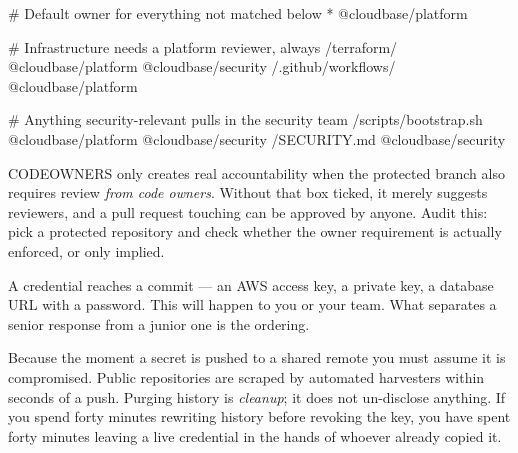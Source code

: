\begin{propsbox}
# Default owner for everything not matched below
*                       @cloudbase/platform

# Infrastructure needs a platform reviewer, always
/terraform/             @cloudbase/platform @cloudbase/security
/.github/workflows/     @cloudbase/platform

# Anything security-relevant pulls in the security team
/scripts/bootstrap.sh   @cloudbase/platform @cloudbase/security
/SECURITY.md            @cloudbase/security
\end{propsbox}

\begin{opsnote}
CODEOWNERS only creates real accountability when the protected branch also requires review \emph{from code owners}. Without that box ticked, it merely suggests reviewers, and a pull request touching  can be approved by anyone. Audit this: pick a protected repository and check whether the owner requirement is actually enforced, or only implied.
\end{opsnote}


 A credential reaches a commit --- an AWS access key, a private key, a database URL with a password. This will happen to you or your team. What separates a senior response from a junior one is the ordering.

 Because the moment a secret is pushed to a shared remote you must assume it is compromised. Public repositories are scraped by automated harvesters within seconds of a push. Purging history is \emph{cleanup}; it does not un-disclose anything. If you spend forty minutes rewriting history before revoking the key, you have spent forty minutes leaving a live credential in the hands of whoever already copied it.

